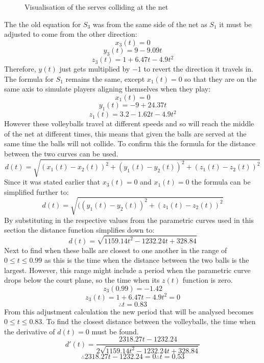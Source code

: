 \documentclass{article}
\begin{document}
\begin{figure}[H]
														\caption{Visualisation of the serves colliding at the net}
														\label{fig:figure3}
													\end{figure}

													The the old equation for \(S_{3}\) was from the same side of the net as \(S_{1}\) it must be adjusted to come from the other direction:
													\[x_{3}(t) = 0\]
													\[y_{3}(t) = 9 - 9.09t\]
													\[z_{3}(t) = 1 + 6.47t - 4.9t^{2}\]
													Therefore, \(y(t)\) just gets multiplied by \(-1\) to revert the direction it travels in. The formula for \(S_{1}\) remains the same, except \(x_{1}(t) = 0\) so that they are on the same axis to simulate players aligning themselves when they play:
													\[x_{1}(t) = 0\]
													\[y_{1}(t) = -9 + 24.37t\]
													\[z_{1}(t) = 3.2 - 1.62t - 4.9t^{2}\]
													However these volleyballs travel at different speeds and so will reach the middle of the net at different times, this means that given the balls are served at the same time the balls will not collide. To confirm this the formula for the distance between the two curves can be used. 
													\[d(t) = \sqrt{(x_{1}(t)-x_{2}(t))^{2}+(y_{1}(t)-y_{2}(t))^{2}+(z_{1}(t)-z_{2}(t))^{2}}\]
													Since it was stated earlier that \(x_{3}(t) = 0\) and \(x_{1}(t) = 0\) the formula can be simplified further to:
													\[d(t) = \sqrt{((y_{1}(t)-y_{2}(t))^{2}+(z_{1}(t)-z_{2}(t))^{2}}\]
													By substituting in the respective values from the parametric curves used in this section the distance function simplifies down to:
													\[d(t) = \sqrt{1159.14t^{2}-1232.24t+328.84}\]
													Next to find when these balls are closest to one another in the range of \(0\le t \le 0.99\) as this is the time when the distance between the two balls is the largest. However, this range might include a period when the parametric curve drops below the court plane, so the time when its \(z(t)\) function is zero. 
													\[z_{3}(0.99) = -1.42\]
													\[z_{3}(t) = 1 + 6.47t - 4.9t^{2} = 0\]
													\[\therefore t = 0.83\]
													From this adjustment calculation the new period that will be analysed becomes \(0\le t \le 0.83\). To find the closest distance between the volleyballs, the time when the derivative of \(d(t) = 0\) must be found. 
													\[d'(t) = \frac{2318.27t - 1232.24}{2\sqrt{1159.14t^{2} - 1232.24t + 328.84}}\]
													\[\therefore 2318.27t - 1232.24 = 0 \therefore t = 0.53\]
\end{document}

